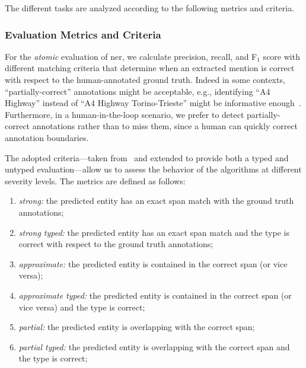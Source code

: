 The different tasks are analyzed according to the following metrics and criteria.
\subsubsection{Evaluation Metrics and Criteria}\label{sec:metrics}
For the \textit{atomic} evaluation of \ac{ner}, we calculate precision, recall, and F$_1$ score with different matching criteria that determine when an extracted mention is correct with respect to the human-annotated ground truth.
Indeed in some contexts, ``partially-correct'' annotations might be acceptable, e.g., identifying ``A4 Highway'' instead of ``A4 Highway Torino-Trieste'' might be informative enough~\cite{nadeau2007survey, tsai2006various}. Furthermore, in a human-in-the-loop scenario, we prefer to detect partially-correct annotations rather than to miss them, since a human can quickly correct annotation boundaries.


The adopted criteria---taken from~\cite{tsai2006various} and extended to provide both a typed and untyped evaluation---allow us to assess the behavior of the algorithms at different severity levels. The metrics are defined as follows:
\begin{enumerate}
    \item \textit{strong:} the predicted entity has an exact span match with the ground truth annotations;
    \item \textit{strong typed:} the predicted entity has an exact span match and the type is correct with respect to the ground truth annotations;
    \item \textit{approximate:} the predicted entity is contained in the correct span (or vice versa);
    \item \textit{approximate typed:} the predicted entity is contained in the correct span (or vice versa) and the type is correct;
    \item \textit{partial:} the predicted entity is overlapping with the correct span;
    \item \textit{partial typed:} the predicted entity is overlapping with the correct span and the type is correct;
\end{enumerate}

